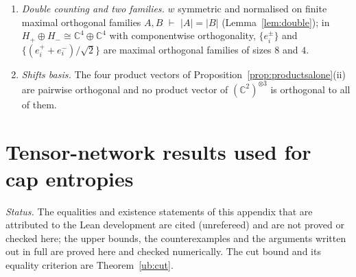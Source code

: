 \documentclass[aps,pra,onecolumn,superscriptaddress,nofootinbib,10pt]{revtex4-2}
\theoremstyle{definition}
\theoremstyle{remark}
\newcommand{\C}{\mathbb{C}}
\begin{document}
\begin{enumerate}[label=(F\arabic*),leftmargin=2.6em]
$\tau(\mathcal P(p,q),\mathcal P(p',q'))=\tau(p,p')\tau(q,q')$ $\vdash$ $\exists$ unitary $U$ onto a four-dimensional
subspace and types $\sigma,\sigma'$ with $\mathcal P([\psi],[\phi])=[U(\psi^\sigma\otimes\phi^{\sigma'})]$.  This one depends on the non-bijective
Wigner theorem \cite{Geher}.
\item \emph{Double counting and two families.}  $w$ symmetric and normalised on finite maximal orthogonal
families $A,B$ $\vdash$ $\lvert A\rvert=\lvert B\rvert$ (Lemma~\ref{lem:double}); in $H_+\oplus H_-\cong\C^4\oplus\C^4$ with componentwise
orthogonality, $\{e^\pm_i\}$ and $\{(e^+_i+e^-_i)/\sqrt2\}$ are maximal orthogonal families of sizes $8$ and $4$.
\item \emph{Shifts basis.}  The four product vectors of Proposition~\ref{prop:productsalone}(ii) are pairwise
orthogonal and no product vector of $(\C^2)^{\otimes3}$ is orthogonal to all of them.
\end{enumerate}


\section{Tensor-network results used for cap entropies}\label{app:tensor}
\noindent\emph{Status.}  The equalities and existence statements of this appendix that are attributed to the Lean
development \cite{ub:lean,obr:leanbridge} are cited (unrefereed) and are not proved or checked here; the upper bounds,
the counterexamples and the arguments written out in full are proved here and checked numerically.  The cut bound
and its equality criterion are Theorem~\ref{ub:cut}.
\end{document}
